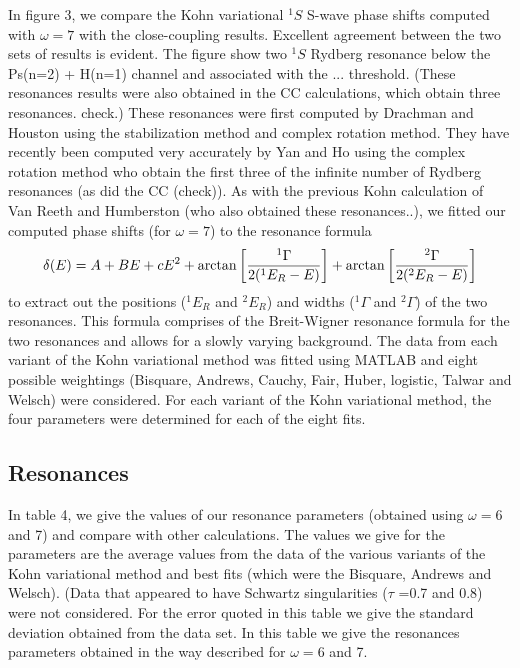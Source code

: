 \documentclass[preprint,showpacs,preprintnumbers,amsmath,amssymb]{revtex4}
\def \bea{\begin{eqnarray}}
\def \eea{\end{eqnarray}}
\begin{document}
In figure 3, we compare the Kohn variational
$^1S$ S-wave phase shifts computed with $\omega =7$
with the close-coupling results.
Excellent agreement between the
two sets of results is evident.
The figure show two $^1S$ Rydberg resonance below the
Ps(n=2) + H(n=1) channel
and associated
with the ... threshold.
(These resonances results were also obtained in the CC calculations,
which obtain three resonances. check.)
These resonances were first computed by
Drachman and Houston using the stabilization
method and complex rotation method.
They have recently been computed very accurately
by Yan and Ho
using the complex rotation method who
obtain the first three of the infinite
number of Rydberg resonances (as did the CC (check)).
As with the previous Kohn calculation of Van Reeth and Humberston (who also
obtained these resonances..),
we fitted our computed phase shifts (for $\omega=7$) to
the resonance formula
\bea
\delta(E) =  A + B E + c E^2
+ \arctan\bigg[ {^1\Gamma\over 2(^1E_R - E)} \bigg]
+ \arctan\bigg[ {^2\Gamma\over 2(^2E_R - E)} \bigg]
\eea
to extract out the positions ($^1E_R$ and $^2E_R$) and widths
($^1\Gamma$ and $^2\Gamma$) of the two resonances.
This formula comprises of the Breit-Wigner resonance
formula for the two resonances and allows for a slowly varying
background.
The data from each variant of
the Kohn variational method was fitted using MATLAB
and eight possible weightings
(Bisquare, Andrews, Cauchy, Fair, Huber, logistic, Talwar and Welsch)
were considered.
For each variant of the Kohn variational
method, the four parameters were determined for each
of the eight fits.

\subsection{Resonances}

In table 4, we give the values of our resonance
parameters (obtained using $\omega=6$ and 7)
and compare with other calculations.
The values we give for the
parameters are the average values from
the data of the 
 various variants of the
Kohn variational method and  best fits (which were the
Bisquare, Andrews and Welsch).
(Data that appeared to have Schwartz singularities ($\tau$ =0.7 and 0.8)
were not considered.
For the error quoted in this table we give
the standard deviation obtained from the data set.
In this table we give the resonances parameters
obtained in the way described for $\omega=6$ and 7.
\end{document}
